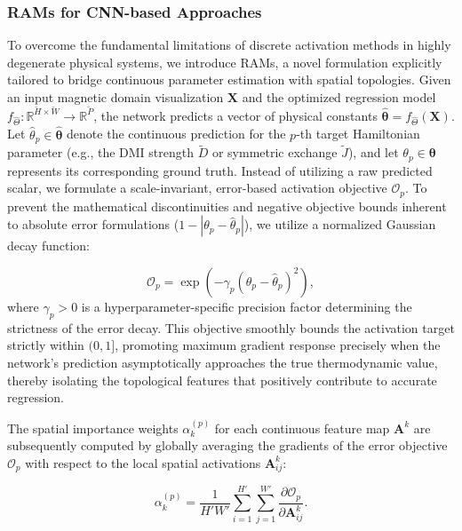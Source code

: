 \documentclass[a4paper,fleqn]{cas-sc}
\begin{document}
\subsubsection{RAMs for CNN-based Approaches}\label{sec:CNN_RAMs}

To overcome the fundamental limitations of discrete activation methods in highly degenerate physical systems, we introduce RAMs, a novel formulation explicitly tailored to bridge continuous parameter estimation with spatial topologies. Given an input magnetic domain visualization $\mathbf{X}$ and the optimized regression model $f_{\hat{\Theta}} : \mathbb{R}^{\breve{H} \times \breve{W}} \rightarrow \mathbb{R}^{\breve{P}}$, the network predicts a vector of physical constants $\hat{\boldsymbol{\theta}} = f_{\hat{\Theta}}(\mathbf{X})$. Let $\hat{\theta}_p \in \hat{\boldsymbol{\theta}}$ denote the continuous prediction for the $p$-th target Hamiltonian parameter (e.g., the DMI strength $\tilde{D}$ or symmetric exchange $\tilde{J}$), and let $\theta_p \in \boldsymbol{\theta}$ represents its corresponding ground truth. Instead of utilizing a raw predicted scalar, we formulate a scale-invariant, error-based activation objective $\mathcal{O}_p$. To prevent the mathematical discontinuities and negative objective bounds inherent to absolute error formulations ($1 - |\theta_p - \hat{\theta}_p|$), we utilize a normalized Gaussian decay function:

\begin{equation}\label{eq:RAM_Objective}
\mathcal{O}_p = \exp\left(-\gamma_p \left(\theta_p - \hat{\theta}_p\right)^2\right),
\end{equation}
where $\gamma_p>0$ is a hyperparameter-specific precision factor determining the strictness of the error decay. This objective smoothly bounds the activation target strictly within $(0, 1]$, promoting maximum gradient response precisely when the network's prediction asymptotically approaches the true thermodynamic value, thereby isolating the topological features that positively contribute to accurate regression.

The spatial importance weights $\alpha_k^{(p)}$ for each continuous feature map $\mathbf{A}^k$ are subsequently computed by globally averaging the gradients of the error objective $\mathcal{O}_p$ with respect to the local spatial activations $\mathbf{A}_{ij}^k$:

\begin{equation}\label{eq:RAM_Weights}
\alpha_k^{(p)} = \frac{1}{H' W'} \sum_{i=1}^{H'} \sum_{j=1}^{W'} \frac{\partial \mathcal{O}_p}{\partial \mathbf{A}_{ij}^k}.
\end{equation}
\end{document}
